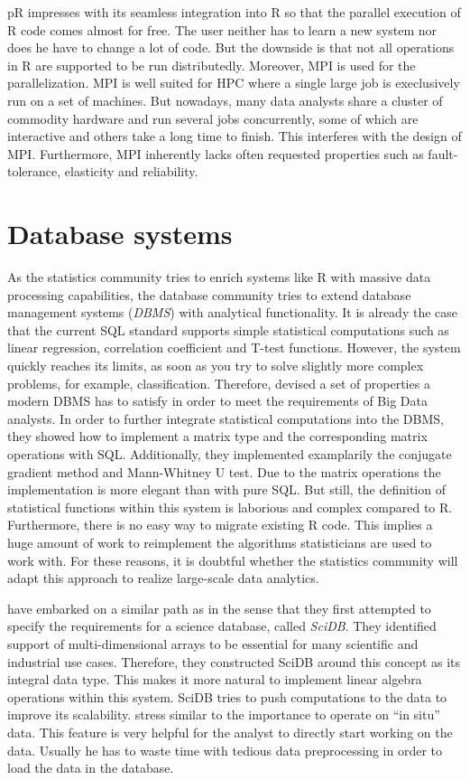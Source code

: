 pR impresses with its seamless integration into R so that the parallel execution of R code comes almost for free.
The user neither has to learn a new system nor does he have to change a lot of code.
But the downside is that not all operations in R are supported to be run distributedly.
Moreover, MPI is used for the parallelization.
MPI is well suited for HPC where a single large job is execlusively run on a set of machines.
But nowadays, many data analysts share a cluster of commodity hardware and run several jobs concurrently, some of which are interactive and others take a long time to finish.
This interferes with the design of MPI.
Furthermore, MPI inherently lacks often requested properties such as fault-tolerance, elasticity and reliability.

\section{Database systems}

As the statistics community tries to enrich systems like R with massive data processing capabilities, the database community tries to extend database management systems (\emph{DBMS}) with analytical functionality.
It is already the case that the current SQL standard supports simple statistical computations such as linear regression, correlation coefficient and T-test functions.
However, the system quickly reaches its limits, as soon as you try to solve slightly more complex problems, for example, classification.
Therefore, \textcite{cohen:pve2009a} devised a set of properties a modern DBMS has to satisfy in order to meet the requirements of Big Data analysts.
In order to further integrate statistical computations into the DBMS, they showed how to implement a matrix type and the corresponding matrix operations with SQL.
Additionally, they implemented examplarily the conjugate gradient method and Mann-Whitney U test.
Due to the matrix operations the implementation is more elegant than with pure SQL.
But still, the definition of statistical functions within this system is laborious and complex compared to R.
Furthermore, there is no easy way to migrate existing R code.
This implies a huge amount of work to reimplement the algorithms statisticians are used to work with.
For these reasons, it is doubtful whether the statistics community will adapt this approach to realize large-scale data analytics.

\Textcite{stonebraker:2009a} have embarked on a similar path as \citeauthor{cohen:pve2009a} in the sense that they first attempted to specify the requirements for a science database, called \emph{SciDB}.
They identified support of multi-dimensional arrays to be essential for many scientific and industrial use cases.
Therefore, they constructed SciDB around this concept as its integral data type.
This makes it more natural to implement linear algebra operations within this system.
SciDB tries to push computations to the data to improve its scalability.
\citeauthor{stonebraker:2009a} stress similar to \citeauthor{cohen:pve2009a} the importance to operate on ``in situ'' data.
This feature is very helpful for the analyst to directly start working on the data.
Usually he has to waste time with tedious data preprocessing in order to load the data in the database.

